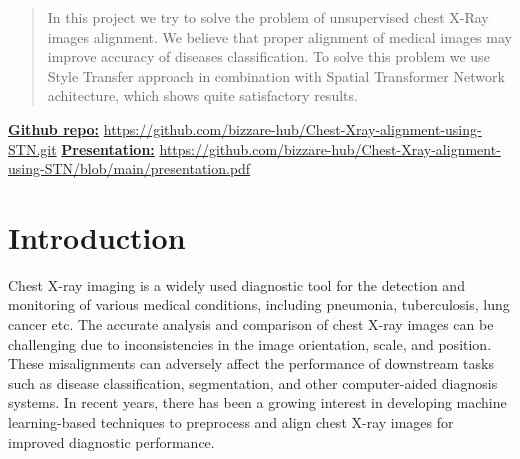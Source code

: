 \documentclass{article}
\begin{document}
\printAffiliationsAndNotice{}  %
\begin{abstract}

In this project we try to solve the problem of unsupervised chest X-Ray images
 alignment. We believe that proper alignment of medical images may improve accuracy
 of diseases classification. To solve this problem we use Style Transfer approach
 in combination with Spatial Transformer Network achitecture, which shows quite
 satisfactory results.

\end{abstract}

\underline{\textbf{Github repo:}} \href{https://github.com/bizzare-hub/Chest-Xray-alignment-using-STN.git}{https://github.com/bizzare-hub/Chest-Xray-alignment-using-STN.git}\newline
\underline{\textbf{Presentation:}} \href{https://github.com/bizzare-hub/Chest-Xray-alignment-using-STN/blob/main/presentation.pdf}{https://github.com/bizzare-hub/Chest-Xray-alignment-using-STN/blob/main/presentation.pdf}

\section{Introduction}\label{introduction}

Chest X-ray imaging is a widely used diagnostic tool for the detection and 
 monitoring of various medical conditions, including pneumonia, tuberculosis, 
 lung cancer etc. The accurate analysis and comparison of chest X-ray images 
 can be challenging due to inconsistencies in the image orientation, scale, 
 and position. These misalignments can adversely affect the performance of 
 downstream tasks such as disease classification, segmentation, and other 
 computer-aided diagnosis systems. In recent years, there has been a growing 
 interest in developing machine learning-based techniques to preprocess and 
 align chest X-ray images for improved diagnostic performance.
\end{document}
